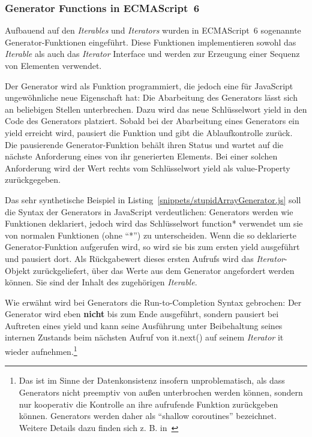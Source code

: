 \documentclass[
11pt, %
a4paper, %
oneside, %
pdfspacing, %
headinclude,
BCOR5mm, %
ngerman, %
bibtotocnumbered,
]{scrartcl}
\begin{document}
	\subsubsection{Generator Functions in ECMAScript~6}

		Aufbauend auf den \emph{Iterables} und \emph{Iterators} wurden in ECMAScript~6 sogenannte Generator-Funktionen eingeführt. Diese Funktionen implementieren sowohl das \emph{Iterable} als auch das \emph{Iterator} Interface und werden zur Erzeugung einer Sequenz von Elementen verwendet. 
		
		Der Generator wird als Funktion programmiert, die jedoch eine für JavaScript ungewöhnliche neue Eigenschaft hat: Die Abarbeitung des Generators lässt sich an beliebigen Stellen unterbrechen. Dazu wird das neue Schlüsselwort \textsf{yield} in den Code des Generators platziert. Sobald bei der Abarbeitung eines Generators ein \textsf{yield} erreicht wird, pausiert die Funktion und gibt die Ablaufkontrolle zurück. Die pausierende Generator-Funktion behält ihren Status und wartet auf die nächste Anforderung eines von ihr generierten Elements. Bei einer solchen Anforderung wird der Wert rechts vom Schlüsselwort \textsf{yield} als \textsf{value}-Property zurückgegeben. 
		
		
		Das sehr synthetische Beispiel in Listing~\ref{snippets/stupidArrayGenerator.js} soll die Syntax der Generators in JavaScript verdeutlichen: Generators werden wie Funktionen deklariert, jedoch wird das Schlüsselwort \textsf{function*} verwendet um sie von normalen Funktionen (ohne "`\textsf{*}"') zu unterscheiden. Wenn die so deklarierte Generator-Funktion aufgerufen wird, so wird sie bis zum ersten \textsf{yield} ausgeführt und pausiert dort. Als Rückgabewert dieses ersten Aufrufs wird das \emph{Iterator}-Objekt zurückgeliefert, über das Werte aus dem Generator angefordert werden können. Sie sind der Inhalt des zugehörigen \emph{Iterable}.
		
		Wie erwähnt wird bei Generators die Run-to-Completion Syntax gebrochen: Der Generator wird eben \textbf{nicht} bis zum Ende ausgeführt, sondern pausiert bei Auftreten eines \textsf{yield} und kann seine Ausführung unter Beibehaltung seines internen Zustands beim nächsten Aufruf von \textsf{it.next()} auf seinem \emph{Iterator} \textsf{it} wieder aufnehmen.\footnote{Das ist im Sinne der Datenkonsistenz insofern unproblematisch, als dass Generators nicht preemptiv von außen unterbrochen werden können, sondern nur kooperativ die Kontrolle an ihre aufrufende Funktion zurückgeben können. Generators werden daher als "`shallow coroutines"' bezeichnet. Weitere Details dazu finden sich z. B. in~\citep{Herman.01.04.2016}}
		
\end{document}
